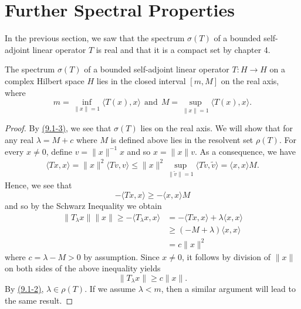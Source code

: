 \section{Further Spectral Properties}

In the previous section, we saw that the spectrum \( \sigma(T) \) of a bounded self-adjoint linear operator \( T  \) is real and that it is a compact set by chapter 4.




\begin{theorem}[Spectrum]
    The spectrum \( \sigma(T) \) of a bounded self-adjoint linear operator \( T: H \to H  \) on a complex Hilbert space \( H  \) lies in the closed interval \( [m,M] \) on the real axis, where 
    \[  m = \inf_{\|x\|=1} \langle T(x) , x \rangle \ \ \text{and} \ \ M = \sup_{\|x\|=1} \langle T(x) , x \rangle.  \tag{1}\]
\end{theorem}

\begin{proof}
    By {\hyperref[(9.1-3)]{(9.1-3)}}, we see that \( \sigma(T) \) lies on the real axis. We will show that for any real \( \lambda = M + c  \) where \( M  \) is defined above lies in the resolvent set \( \rho(T) \). For every \( x \neq 0  \), define \( v = \|x\|^{-1} x  \) and so \( x = \|x \| v   \). As a consequence, we have 
    \begin{align*}
        \langle Tx ,x  \rangle = \|x\|^{2} \langle Tv  , v  \rangle \leq \|x\|^{2} \sup_{\|\tilde{v}\| = 1} \langle T \tilde{v} , \tilde{v} \rangle = \langle x , x \rangle M.  
    \end{align*}
    Hence, we see that 
    \[  - \langle Tx , x  \rangle \geq - \langle x , x \rangle M  \]
    and so by the Schwarz Inequality we obtain
    \begin{align*}
        \|{T}_{\lambda}x \| \|x\| \geq - \langle {T}_{\lambda}x , x \rangle &= - \langle Tx , x \rangle + \lambda \langle x , x \rangle \\
                                                                            &\geq (-M + \lambda) \langle x , x \rangle \\ 
                                                                            &= c \|x\|^{2}
    \end{align*}
    where \( c = \lambda - M  > 0  \) by assumption. Since \( x \neq 0  \), it follows by division of \( \|x\| \) on both sides of the above inequality yields
    \[  \|{T}_{\lambda}x \| \geq c \|x\|. \]
    By {\hyperref[(9.1-2)]{(9.1-2)}}, \( \lambda \in \rho(T) \). If we assume \( \lambda < m  \), then a similar argument will lead to the same result.
\end{proof}

